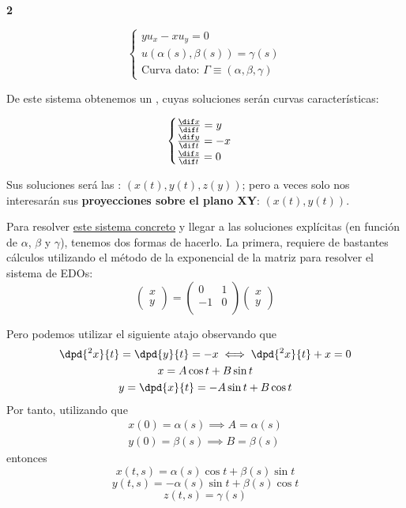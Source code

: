 	\begin{example}{\bf 2}

		\begin{equation*}
			\begin{cases}
				yu_x - x u_y = 0 \\
				u(\alpha(s),\beta(s)) = \gamma(s) \\
				\text{Curva dato: } \Gamma \equiv (\alpha, \beta, \gamma)
			\end{cases}
		\end{equation*}

		De este sistema obtenemos un , cuyas soluciones serán curvas características:

		\begin{equation*}
			\begin{cases}
				\frac{\dif x}{\dif t} = y \\
				\frac{\dif y}{\dif t} = -x \\
				\frac{\dif z}{\dif t} = 0
			\end{cases}
		\end{equation*}

		Sus soluciones será las :
		$(x(t),y(t),z(y))$; pero a veces solo nos interesarán sus {\bf proyecciones sobre el plano XY}: $(x(t),y(t))$.

		Para resolver \underline{este sistema concreto} y llegar a las soluciones explícitas (en función de $\alpha$, $\beta$ y $\gamma$), tenemos dos formas de hacerlo.
		La primera, requiere de bastantes cálculos utilizando el método de la exponencial de la matriz para resolver el sistema de EDOs:
		\[ \begin{pmatrix}
			x \\
			y
			\end{pmatrix} =
		\begin{pmatrix}
			 0 & 1 \\
			-1 & 0 \\
			\end{pmatrix}
			\begin{pmatrix}
			x \\
			y
			\end{pmatrix}\]

		Pero podemos utilizar el siguiente atajo observando que
		\begin{gather*}
			\dpd{^2 x}{t} = \dpd{y}{t} = -x \iff \dpd{^2 x}{t} + x = 0\\
			x = A \cos t + B \sin t\\
			y = \dpd{x}{t} = -A \sin t + B \cos t
		\end{gather*}
		Por tanto, utilizando que
		\begin{gather*}
			x(0) =\alpha(s)	\implies A = \alpha(s)\\
			y(0) = \beta(s) \implies B = \beta(s)
		\end{gather*}
		entonces
		$$x(t,s) = \alpha(s) \cos t + \beta (s) \sin t$$
		$$y(t,s) = -\alpha(s) \sin t + \beta (s) \cos t$$
		$$z(t,s) = \gamma(s)$$


\end{example}
